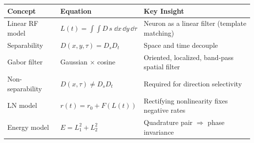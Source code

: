 \begin{chaptersummary}

\begin{center}
\renewcommand{\arraystretch}{1.6}
\begin{tabularx}{\textwidth}{@{}l X X@{}}
  \toprule
  \textbf{Concept} & \textbf{Equation} & \textbf{Key Insight} \\
  \midrule
  Linear RF model &
  $\displaystyle L(t) = \int\!\!\int D\, s\;\dd x\,\dd y\,\dd\tau$ &
  Neuron as a linear filter (template matching) \\
  Separability &
  $D(x,y,\tau) = D_s D_t$ &
  Space and time decouple \\
  Gabor filter &
  Gaussian $\times$ cosine &
  Oriented, localized, band-pass spatial filter \\
  Non-separability &
  $D(x,\tau) \neq D_s D_t$ &
  Required for direction selectivity \\
  LN model &
  $r(t) = r_0 + F(L(t))$ &
  Rectifying nonlinearity fixes negative rates \\
  Energy model &
  $E = L_1^2 + L_2^2$ &
  Quadrature pair $\Rightarrow$ phase invariance \\
  \bottomrule
\end{tabularx}
\end{center}

\end{chaptersummary}

